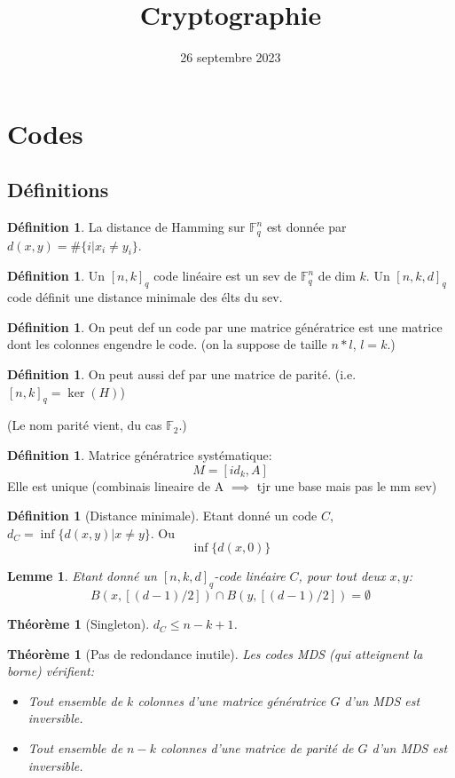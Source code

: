 \documentclass[12pt]{article}
\title{Cryptographie}
\date{26 septembre 2023}
\theoremstyle{plain}
\newtheorem{thm}[subsubsection]{Th\'eor\`eme}
\newtheorem{lem}[subsubsection]{Lemme}
\theoremstyle{definition}
\newtheorem{defn}[subsubsection]{D\'efinition}
\theoremstyle{remark}
\newcommand{\F}{\mathbb{F}}
\begin{document}
\maketitle

\section{Codes}
\subsection{Définitions}
\begin{defn}
    La distance de Hamming sur $\F_q^n$ est donnée par $d(x,y)=\#\{i|x_i\ne y_i\}$.
\end{defn}
\begin{defn}
    Un \([n,k]_q\) code linéaire est un sev de $\F_q^n$ de dim $k$. Un $[n,k,d]_q$ code 
    définit une distance minimale des élts du sev.
\end{defn}
\begin{defn}
    On peut def un code par une matrice génératrice
    est une matrice dont les colonnes engendre le code.
    (on la suppose de taille $n*l$, $l=k$.)
\end{defn}

\begin{defn}
    On peut aussi def par une matrice de parité. (i.e. $[n,k]_q=\ker(H)$)
\end{defn}
(Le nom parité vient, du cas $\F_2$.)

\begin{defn}
    Matrice génératrice systématique: \[M=[id_k, A]\]
    Elle est unique (combinais lineaire de A $\implies$ tjr une base mais pas le mm sev)
\end{defn}

\begin{defn}[Distance minimale]
    Etant donné un code $C$, $d_{C}=\inf\{d(x,y)| x\ne y\}$. Ou 
    \[
        \inf\{d(x,0)\}
    \]
\end{defn}

\begin{lem}
    Etant donné un $[n,k,d]_q$-code linéaire $C$, pour tout deux $x,y$: 
    \[
        B(x,[(d-1)/2])\cap B(y,[(d-1)/2])=\emptyset
    \]
\end{lem}

\begin{thm}[Singleton]
    $d_C\leq n-k+1$.
\end{thm}

\begin{thm}[Pas de redondance inutile]
    Les codes MDS (qui atteignent la borne) vérifient:
    \begin{itemize}
        \item Tout ensemble de $k$ colonnes d'une matrice génératrice $G$ d'un MDS 
        est inversible.
        \item Tout ensemble de $n-k$ colonnes d'une matrice de parité de $G$ d'un MDS 
        est inversible.
    \end{itemize}
\end{thm}
\end{document}
